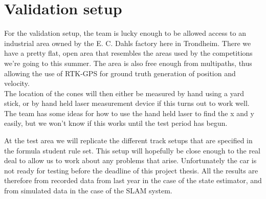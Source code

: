 \section{Validation setup}
For the validation setup, the team is lucky enough to be allowed access to an industrial area owned by the E. C. Dahls factory here in Trondheim. There we have a pretty flat, open area that resembles the areas used by the competitions we're going to this summer. The area is also free enough from multipaths, thus allowing the use of RTK-GPS for ground truth generation of position and velocity. \\

The location of the cones will then either be measured by hand using a yard stick, or by hand held laser measurement device if this turns out to work well. The team has some ideas for how to use the hand held laser to find the x and y easily, but we won't know if this works until the test period has begun. 

At the test area we will replicate the different track setups that are specified in the formula student rule set. This setup will hopefully be close enough to the real deal to allow us to work about any problems that arise. Unfortunately the car is not ready for testing before the deadline of this project thesis. All the results are therefore from recorded data from last year in the case of the state estimator, and from simulated data in the case of the SLAM system. \\

